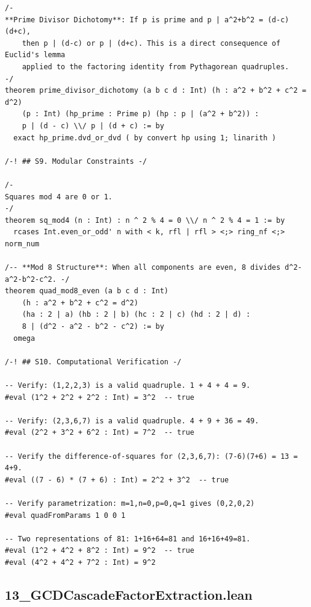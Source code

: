 \documentclass[11pt,openright,twoside]{book}
\theoremstyle{definition}
\begin{document}
\begin{lstlisting}[style=lean]
/-
**Prime Divisor Dichotomy**: If p is prime and p | a^2+b^2 = (d-c)(d+c),
    then p | (d-c) or p | (d+c). This is a direct consequence of Euclid's lemma
    applied to the factoring identity from Pythagorean quadruples.
-/
theorem prime_divisor_dichotomy (a b c d : Int) (h : a^2 + b^2 + c^2 = d^2)
    (p : Int) (hp_prime : Prime p) (hp : p | (a^2 + b^2)) :
    p | (d - c) \\/ p | (d + c) := by
  exact hp_prime.dvd_or_dvd ( by convert hp using 1; linarith )

/-! ## S9. Modular Constraints -/

/-
Squares mod 4 are 0 or 1.
-/
theorem sq_mod4 (n : Int) : n ^ 2 % 4 = 0 \\/ n ^ 2 % 4 = 1 := by
  rcases Int.even_or_odd' n with < k, rfl | rfl > <;> ring_nf <;> norm_num

/-- **Mod 8 Structure**: When all components are even, 8 divides d^2-a^2-b^2-c^2. -/
theorem quad_mod8_even (a b c d : Int)
    (h : a^2 + b^2 + c^2 = d^2)
    (ha : 2 | a) (hb : 2 | b) (hc : 2 | c) (hd : 2 | d) :
    8 | (d^2 - a^2 - b^2 - c^2) := by
  omega

/-! ## S10. Computational Verification -/

-- Verify: (1,2,2,3) is a valid quadruple. 1 + 4 + 4 = 9.
#eval (1^2 + 2^2 + 2^2 : Int) = 3^2  -- true

-- Verify: (2,3,6,7) is a valid quadruple. 4 + 9 + 36 = 49.
#eval (2^2 + 3^2 + 6^2 : Int) = 7^2  -- true

-- Verify the difference-of-squares for (2,3,6,7): (7-6)(7+6) = 13 = 4+9.
#eval ((7 - 6) * (7 + 6) : Int) = 2^2 + 3^2  -- true

-- Verify parametrization: m=1,n=0,p=0,q=1 gives (0,2,0,2)
#eval quadFromParams 1 0 0 1

-- Two representations of 81: 1+16+64=81 and 16+16+49=81.
#eval (1^2 + 4^2 + 8^2 : Int) = 9^2  -- true
#eval (4^2 + 4^2 + 7^2 : Int) = 9^2
\end{lstlisting}

\clearpage


\subsection*{13\_GCDCascadeFactorExtraction.lean}
\label{lean:13_GCDCascadeFactorExtraction}
\end{document}
